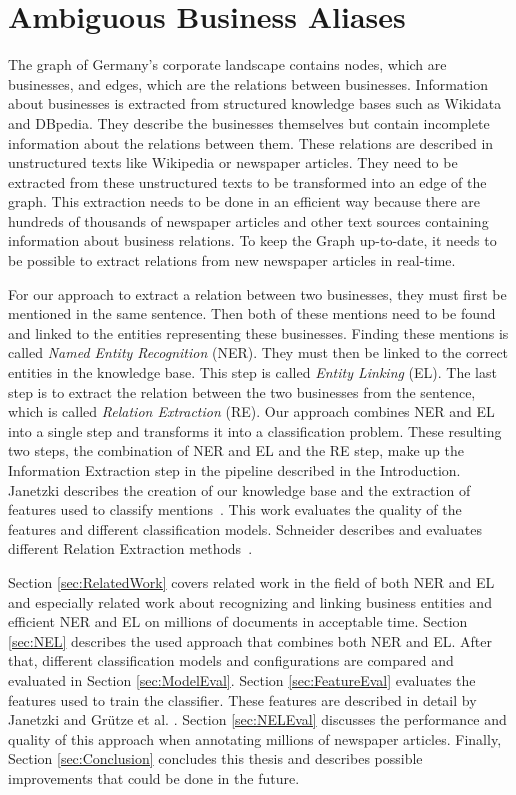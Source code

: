\section{Ambiguous Business Aliases}
\label{sec:IntroABA}
The graph of Germany's corporate landscape contains nodes, which are businesses, and edges, which are the relations between businesses. Information about businesses is extracted from structured knowledge bases such as Wikidata and DBpedia. They describe the businesses themselves but contain incomplete information about the relations between them. These relations are described in unstructured texts like Wikipedia or newspaper articles. They need to be extracted from these unstructured texts to be transformed into an edge of the graph. This extraction needs to be done in an efficient way because there are hundreds of thousands of newspaper articles and other text sources containing information about business relations. To keep the Graph up-to-date, it needs to be possible to extract relations from new newspaper articles in real-time.\par
For our approach to extract a relation between two businesses, they must first be mentioned in the same sentence. Then both of these mentions need to be found and linked to the entities representing these businesses. Finding these mentions is called \textit{Named Entity Recognition} (NER). They must then be linked to the correct entities in the knowledge base. This step is called \textit{Entity Linking} (EL). The last step is to extract the relation between the two businesses from the sentence, which is called \textit{Relation Extraction} (RE). Our approach combines NER and EL into a single step and transforms it into a classification problem. These resulting two steps, the combination of NER and EL and the RE step, make up the Information Extraction step in the pipeline described in the Introduction. Janetzki describes the creation of our knowledge base and the extraction of features used to classify mentions\ \cite{janetzki}. This work evaluates the quality of the features and different classification models. Schneider describes and evaluates different Relation Extraction methods\ \cite{schneider}.\par
Section \ref{sec:RelatedWork} covers related work in the field of both NER and EL and especially related work about recognizing and linking business entities and efficient NER and EL on millions of documents in acceptable time. Section \ref{sec:NEL} describes the used approach that combines both NER and EL. After that, different classification models and configurations are compared and evaluated in Section \ref{sec:ModelEval}. Section \ref{sec:FeatureEval} evaluates the features used to train the classifier. These features are described in detail by Janetzki \cite{janetzki} and Grütze et al. \cite{coheel}. Section \ref{sec:NELEval} discusses the performance and quality of this approach when annotating millions of newspaper articles. Finally, Section \ref{sec:Conclusion} concludes this thesis and describes possible improvements that could be done in the future.
